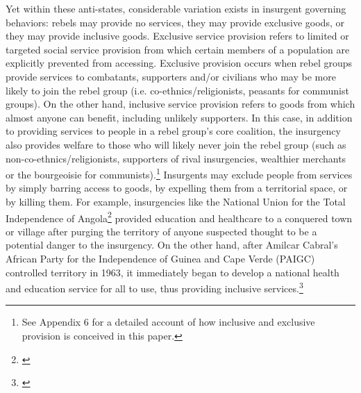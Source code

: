 \documentclass[12pt, letterpaper]{article}
\begin{document}
Yet within these anti-states, considerable variation exists in insurgent governing behaviors: rebels may provide no services, they may provide exclusive goods, or they may provide inclusive goods. Exclusive service provision refers to limited or targeted social service provision from which certain members of a population are explicitly prevented from accessing. Exclusive provision occurs when rebel groups provide services to combatants, supporters and/or civilians who may be more likely to join the rebel group (i.e. co-ethnics/religionists, peasants for communist groups). On the other hand, inclusive service provision refers to goods from which almost anyone can benefit, including unlikely supporters. In this case, in addition to providing services to people in a rebel group's core coalition, the insurgency also provides welfare to those who will likely never join the rebel group (such as non-co-ethnics/religionists, supporters of rival insurgencies, wealthier merchants or the bourgeoisie for communists).\footnote{See Appendix 6 for a detailed account of how inclusive and exclusive provision is conceived in this paper.} Insurgents may exclude people from services by simply barring access to goods, by expelling them from a territorial space, or by killing them. For example, insurgencies like the National Union for the Total Independence of Angola\footnote{\citealt[103-9]{collelo1991angola}} provided education and healthcare to a conquered town or village after purging the territory of anyone suspected thought to be a potential danger to the insurgency. On the other hand, after Amilcar Cabral's African Party for the Independence of Guinea and Cape Verde (PAIGC) controlled territory in 1963, it immediately began to develop a national health and education service for all to use, thus providing inclusive services.\footnote{\citealt[61 and 97]{dhada1993warriors}}%

\end{document}
